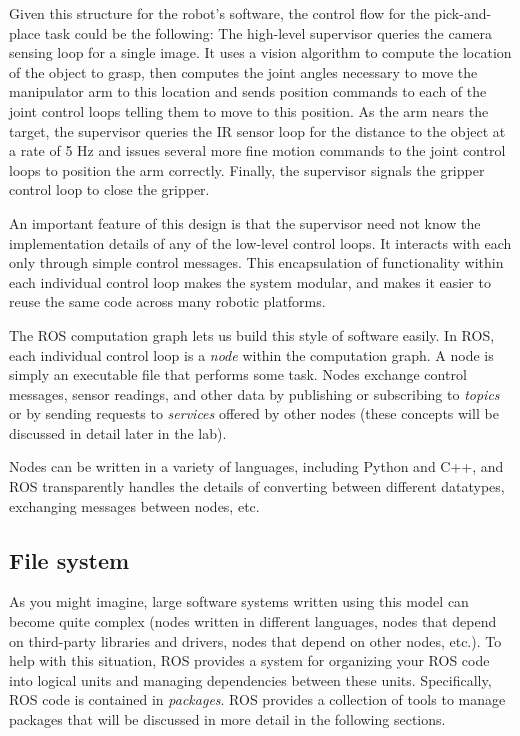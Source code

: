 \documentclass{article}
\begin{document}
Given this structure for the robot's software, the control flow for the pick-and-place task could be the following: The high-level supervisor queries the camera sensing loop for a single image. It uses a vision algorithm to compute the location of the object to grasp, then computes the joint angles necessary to move the manipulator arm to this location and sends position commands to each of the joint control loops telling them to move to this position. As the arm nears the target, the supervisor queries the IR sensor loop for the distance to the object at a rate of 5 Hz and issues several more fine motion commands to the joint control loops to position the arm correctly. Finally, the supervisor signals the gripper control loop to close the gripper.

An important feature of this design is that the supervisor need not know the implementation details of any of the low-level control loops. It interacts with each only through simple control messages. This encapsulation of functionality within each individual control loop makes the system modular, and makes it easier to reuse the same code across many robotic platforms.

The ROS computation graph lets us build this style of software easily. In ROS, each individual control loop is a \emph{node} within the computation graph. A node is simply an executable file that performs some task. Nodes exchange control messages, sensor readings, and other data by publishing or subscribing to \emph{topics} or by sending requests to \emph{services} offered by other nodes (these concepts will be discussed in detail later in the lab).

Nodes can be written in a variety of languages, including Python and C++, and ROS transparently handles the details of converting between different datatypes, exchanging messages between nodes, etc.

\subsection{File system}
As you might imagine, large software systems written using this model can become quite complex (nodes written in different languages, nodes that depend on third-party libraries and drivers, nodes that depend on other nodes, etc.). To help with this situation, ROS provides a system for organizing your ROS code into logical units and managing dependencies between these units. Specifically, ROS code is contained in \emph{packages}. ROS provides a collection of tools to manage packages that will be discussed in more detail in the following sections.
\end{document}
